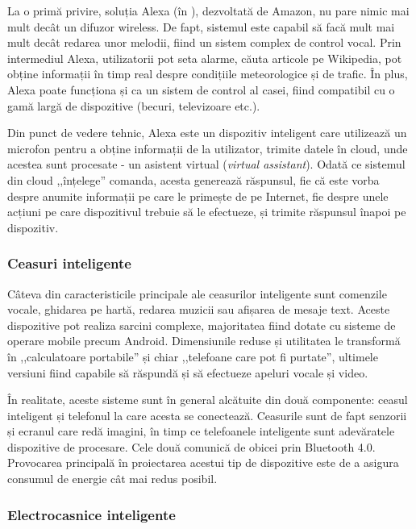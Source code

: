 La o primă privire, soluția Alexa (în ), dezvoltată de Amazon, nu pare nimic mai mult decât un difuzor wireless.
De fapt, sistemul este capabil să facă mult mai mult decât redarea unor melodii, fiind un sistem complex de control vocal.
Prin intermediul Alexa, utilizatorii pot seta alarme, căuta articole pe Wikipedia, pot obține informații în timp real despre condițiile meteorologice și de trafic.
În plus, Alexa poate funcționa și ca un sistem de control al casei, fiind compatibil cu o gamă largă de dispozitive (becuri, televizoare etc.).

Din punct de vedere tehnic, Alexa este un dispozitiv inteligent care utilizează un microfon pentru a obține informații de la utilizator, trimite datele în cloud, unde acestea sunt procesate - un asistent virtual (\textit{virtual assistant}).
Odată ce sistemul din cloud ,,înțelege'' comanda, acesta generează răspunsul, fie că este vorba despre anumite informații pe care le primește de pe Internet, fie despre unele acțiuni pe care dispozitivul trebuie să le efectueze, și trimite răspunsul înapoi pe dispozitiv.

\subsubsection{Ceasuri inteligente}
\label{sec:embed:iot:impl:smartwatch}

Câteva din caracteristicile principale ale ceasurilor inteligente sunt comenzile vocale, ghidarea pe hartă, redarea muzicii sau afișarea de mesaje text.
Aceste dispozitive pot realiza sarcini complexe, majoritatea fiind dotate cu sisteme de operare mobile precum Android.
Dimensiunile reduse și utilitatea le transformă în ,,calculatoare portabile'' și chiar ,,telefoane care pot fi purtate'', ultimele versiuni fiind capabile să răspundă și să efectueze apeluri vocale și video.

În realitate, aceste sisteme sunt în general alcătuite din două componente: ceasul inteligent și telefonul la care acesta se conectează.
Ceasurile sunt de fapt senzorii și ecranul care redă imagini, în timp ce telefoanele inteligente sunt adevăratele dispozitive de procesare.
Cele două comunică de obicei prin Bluetooth 4.0.
Provocarea principală în proiectarea acestui tip de dispozitive este de a asigura consumul de energie cât mai redus posibil.

\subsubsection{Electrocasnice inteligente}
\label{sec:embed:iot:impl:home}

